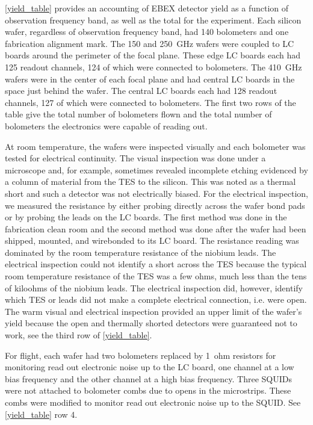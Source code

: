 \TAB\ref{yield_table} provides an accounting of \ac{EBEX} detector yield as a function of observation frequency band, as well as the total for the experiment.
Each silicon wafer, regardless of observation frequency band, had 140 bolometers and one fabrication alignment mark. %
The 150 and 250~GHz wafers were coupled to \ac{LC} boards around the perimeter of the focal plane. These edge \ac{LC} boards each had 125 readout channels, 124 of which were connected to bolometers.  
The 410~GHz wafers were in the center of each focal plane and had central \ac{LC} boards in the space just behind the wafer. The central \ac{LC} boards each had 128 readout channels, 127 of which were connected to bolometers. %
The first two rows of the table give the total number of bolometers flown and the total number of bolometers the electronics were capable of reading out. 

At room temperature, the wafers were inspected visually and each bolometer was tested for electrical continuity. 
The visual inspection was done under a microscope and, for example, sometimes revealed incomplete etching evidenced by a column of material from the \ac{TES} to the silicon. 
This was noted as a thermal short and such a detector was not electrically biased. 
For the electrical inspection, we measured the resistance by either probing directly across the wafer bond pads or by probing the leads on the \ac{LC} boards. 
The first method was done in the fabrication clean room and the second method was done after the wafer had been shipped, mounted, and wirebonded to its \ac{LC} board. 
The resistance reading was dominated by the room temperature resistance of the niobium leads. 
The electrical inspection could not identify a short across the \ac{TES} because the typical room temperature resistance of the \ac{TES} was a few ohms, much less than the tens of kiloohms of the niobium leads. 
The electrical inspection did, however, identify which \ac{TES} or leads did not make a complete electrical connection, i.e. were open. 
The warm visual and electrical inspection provided an upper limit of the wafer's yield because the open and thermally shorted detectors were guaranteed not to work, see the third row of \TAB\ref{yield_table}. 

For flight, each wafer had two bolometers replaced by 1~ohm resistors for monitoring read out electronic noise up to the \ac{LC} board, one channel at a low bias frequency and the other channel at a high bias frequency. 
Three \ac{SQUID}s were not attached to bolometer combs due to opens in the microstrips. These combs were modified to monitor read out electronic noise up to the \ac{SQUID}. See \TAB\ref{yield_table} row 4. 

